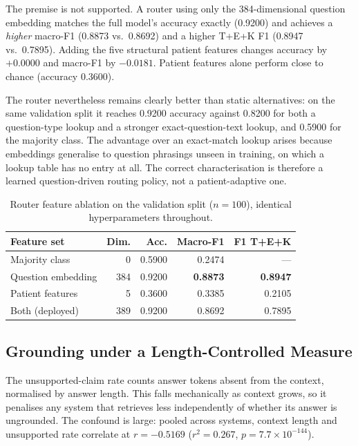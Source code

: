 \documentclass[conference]{IEEEtran}
\begin{document}
The premise is not supported. A router using only the 384-dimensional
question embedding matches the full model's accuracy exactly (0.9200)
and achieves a \textit{higher} macro-F1 (0.8873 vs.\ 0.8692) and a
higher T+E+K F1 (0.8947 vs.\ 0.7895). Adding the five structural
patient features changes accuracy by $+0.0000$ and macro-F1 by
$-0.0181$. Patient features alone perform close to chance
(accuracy 0.3600).

The router nevertheless remains clearly better than static
alternatives: on the same validation split it reaches 0.9200 accuracy
against 0.8200 for both a question-type lookup and a stronger
exact-question-text lookup, and 0.5900 for the majority class. The
advantage over an exact-match lookup arises because embeddings
generalise to question phrasings unseen in training, on which a lookup
table has no entry at all. The correct characterisation is therefore a
learned question-driven routing policy, not a patient-adaptive one.

\begin{table}[t]
\centering
\footnotesize
\setlength{\tabcolsep}{4pt}
\caption{Router feature ablation on the validation split ($n{=}100$), identical hyperparameters throughout.}
\label{tab:ablation}
\begin{tabular}{lrrrr}
\toprule
Feature set & Dim. & Acc. & Macro-F1 & F1 T+E+K \\
\midrule
Majority class     &   0 & 0.5900 & 0.2474 & --- \\
Question embedding & 384 & 0.9200 & \textbf{0.8873} & \textbf{0.8947} \\
Patient features   &   5 & 0.3600 & 0.3385 & 0.2105 \\
Both (deployed)    & 389 & 0.9200 & 0.8692 & 0.7895 \\
\bottomrule
\end{tabular}
\end{table}

\subsection{Grounding under a Length-Controlled Measure}
\label{sec:grounding}

The unsupported-claim rate counts answer tokens absent from the
context, normalised by answer length. This falls mechanically as
context grows, so it penalises any system that retrieves less
independently of whether its answer is ungrounded. The confound is
large: pooled across systems, context length and unsupported rate
correlate at $r = -0.5169$ ($r^2 = 0.267$,
$p = 7.7\times10^{-144}$).
\end{document}
